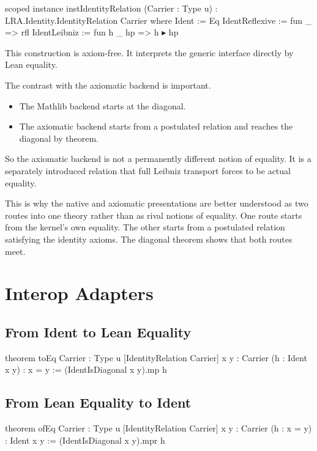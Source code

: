 \documentclass[11pt]{article}
\begin{document}
\begin{leanblock}
scoped instance instIdentityRelation (Carrier : Type u) :
    LRA.Identity.IdentityRelation Carrier where
  Ident := Eq
  IdentReflexive := fun _ => rfl
  IdentLeibniz := fun h _ hp => h ▸ hp
\end{leanblock}

This construction is axiom-free. It interprets the generic interface directly by Lean equality.

The contrast with the axiomatic backend is important.

\begin{itemize}[leftmargin=1.5em]
\item The Mathlib backend starts at the diagonal.
\item The axiomatic backend starts from a postulated relation and reaches the diagonal by theorem.
\end{itemize}

So the axiomatic backend is not a permanently different notion of equality. It is a separately introduced relation that full Leibniz transport forces to be actual equality.

This is why the native and axiomatic presentations are better understood as two routes into one theory rather than as rival notions of equality. One route starts from the kernel's own equality. The other starts from a postulated relation satisfying the identity axioms. The diagonal theorem shows that both routes meet.

\section{Interop Adapters}

\subsection{From Ident to Lean Equality}

\begin{leanblock}
theorem toEq {Carrier : Type u} [IdentityRelation Carrier] {x y : Carrier}
    (h : Ident x y) : x = y :=
  (IdentIsDiagonal x y).mp h
\end{leanblock}

\subsection{From Lean Equality to Ident}

\begin{leanblock}
theorem ofEq {Carrier : Type u} [IdentityRelation Carrier] {x y : Carrier}
    (h : x = y) : Ident x y :=
  (IdentIsDiagonal x y).mpr h
\end{leanblock}
\end{document}
